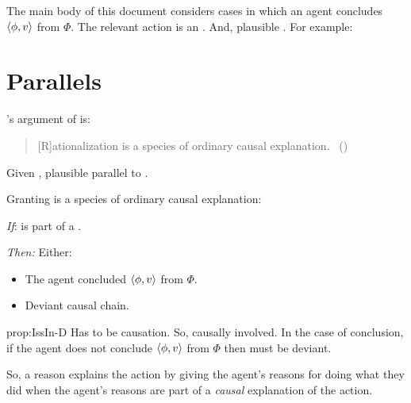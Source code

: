 \begin{note}
  The main body of this document considers cases in which an agent concludes \(\langle\phi, v\rangle\) from \(\Phi\).
  The relevant action is an .
  And, plausible .
  For example:

  
\end{note}



\section{Parallels}
\label{sec:parallel}

\begin{note}
  \citeauthor{Davidson:1963aa}'s argument of  is:
  \begin{quote}
    [R]ationalization is a species of ordinary causal explanation.%
    \mbox{ }\hfill\mbox{(\citeyear[685]{Davidson:1963aa})}
  \end{quote}

  Given \citeauthor{Davidson:1963aa}, plausible parallel to \issueInclusion{}.

  \begin{proposition}
    \label{prop:IssIn-D}
    Granting \rationalisation{} is a species of ordinary causal explanation:
    \begin{itenum}
    \item[\emph{If}:]
       is part of a \rationalisation{}.
    \item[\emph{Then:}]
      Either:
      \begin{itemize}
      \item
        The agent concluded \(\langle\phi, v\rangle\) from \(\Phi\).
      \item
        Deviant causal chain.
      \end{itemize}
    \end{itenum}
  \end{proposition}

  \begin{argument}{prop:IssIn-D}
    Has to be causation.
    So, causally involved.
    In the case of conclusion, if the agent does not conclude \(\langle\phi, v\rangle\) from \(\Phi\) then must be deviant.

    So, a reason explains the action by giving the agent's reasons for doing what they did when the agent's reasons are part of a \emph{causal} explanation of the action.%


\end{argument}
\end{note}
